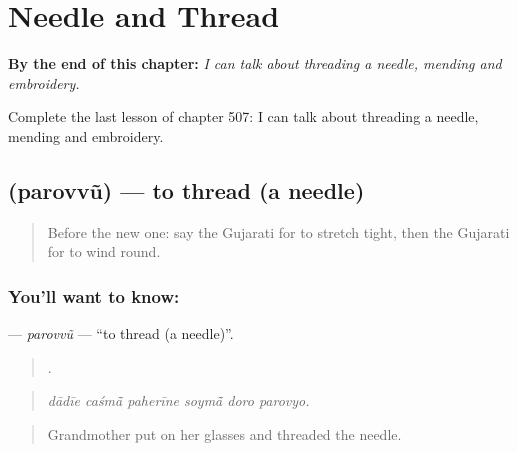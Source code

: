 
\chapter{Needle and Thread}
\label{ch:gu-needle-and-thread}

\begin{chapteropening}
\textbf{By the end of this chapter:} \emph{I can talk about threading a needle, mending and embroidery.}

Complete the last lesson of chapter 507: I can talk about threading a needle, mending and embroidery.
\end{chapteropening}

\section[\texorpdfstring{\gu{પરોવવું} (parovvũ)}{પરોવવું (parovvũ)}]{ (parovvũ) — to thread (a needle)}

\label{lesson:GU-C507-parovvu}



\begin{quote}
Before the new one: say the Gujarati for to stretch tight, then the Gujarati for to wind round.
\end{quote}

\subsection*{You'll want to know: }
\textbf{} — \emph{parovvũ} — \textquotedblleft{}to thread (a needle)\textquotedblright{}.

\begin{quote}
     .
\end{quote}

\begin{quote}
\emph{dādīe caśmā̃ paherīne soymā̃ doro parovyo.}
\end{quote}

\begin{quote}
Grandmother put on her glasses and threaded the needle.
\end{quote}

